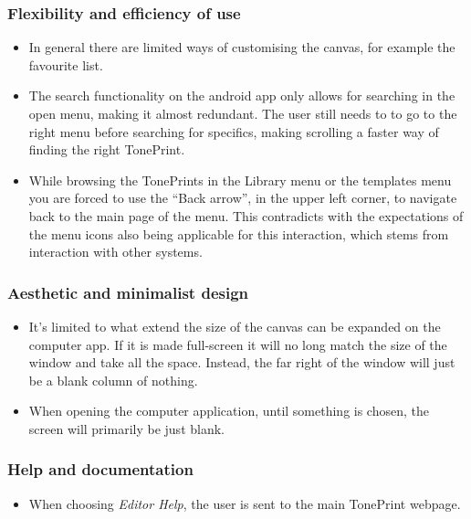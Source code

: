 \subsubsection{Flexibility and efficiency of use}
\begin{itemize}
	\item In general there are limited ways of customising the canvas, for example the favourite list.\\
	\item The search functionality on the android app only allows for searching in the open menu, making it almost redundant. The user still needs to to go to the right menu before searching for specifics, making scrolling a faster way of finding the right TonePrint. \\
	\item While browsing the TonePrints in the Library menu or the templates menu you are forced to use the “Back arrow”, in the upper left corner, to navigate back to the main page of the menu. This contradicts with the expectations of the menu icons also being applicable for this interaction, which stems from interaction with other systems. 
\end{itemize}
%
\subsubsection{Aesthetic and minimalist design}
\begin{itemize}
	\item It’s limited to what extend the size of the canvas can be expanded on the computer app. If it is made full-screen it will no long match the size of the window and take all the space. Instead, the far right of the window will just be a blank column of nothing.\\
	\item When opening the computer application, until something is chosen, the screen will primarily be just blank.
\end{itemize}
%
%
\subsubsection{Help and documentation}
\begin{itemize}
	\item When choosing \textit{Editor Help}, the user is sent to the main TonePrint webpage.
\end{itemize}
%